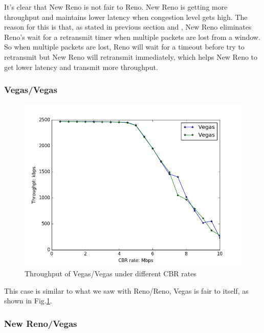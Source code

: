 \documentclass[10pt, conference]{IEEEtran/IEEEtran}
\begin{document}
It's clear that New Reno is not fair to Reno. New Reno is getting more throughput and maintains lower latency when congestion level gets high. The reason for this is that, as stated in previous section and \cite{sim}, New Reno eliminates Reno's wait for a retransmit timer when multiple packets are lost from a window. So when multiple packets are lost, Reno will wait for a timeout before try to retransmit but New Reno will retransmit immediately, which helps New Reno to get lower latency and transmit more throughput.



\subsubsection{Vegas/Vegas}
\begin{figure}[!hb]
\begin{center}
\includegraphics[width=\linewidth]{../exp2/exp2_Vegas_Vegas_thpt.png}
\caption{Throughput of Vegas/Vegas under different CBR rates}
\label{exp2_Vegas_Vegas_thpt}
\end{center}
\end{figure}
This case is similar to what we saw with Reno/Reno, Vegas is fair to itself, as shown in Fig.\ref{exp2_Vegas_Vegas_thpt}.
\subsubsection{New Reno/Vegas}
\end{document}
